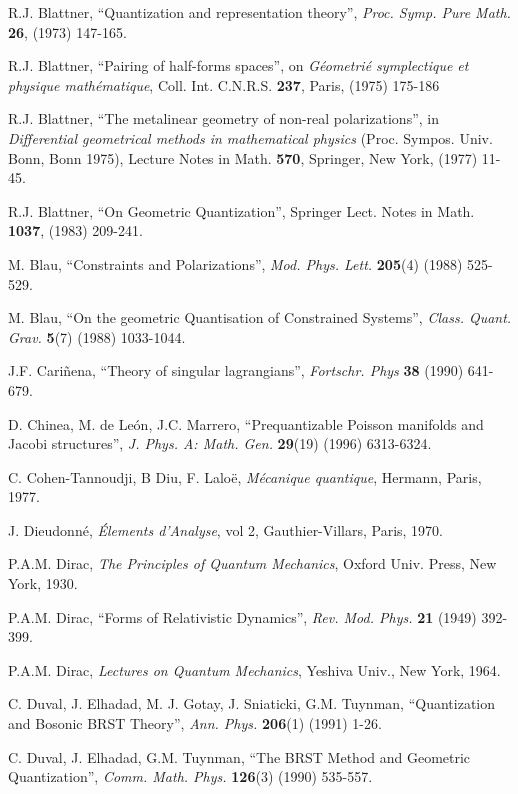 \documentclass[12pt]{article}
\theoremstyle{plain}
\begin{document}
\begin{thebibliography}{55}
{\sc R.J. Blattner},
``Quantization and representation theory'',
{\it Proc. Symp. Pure Math.} {\bf 26}, (1973) 147-165.

{\sc R.J. Blattner},
``Pairing of half-forms spaces'',
on {\it G\'eometri\'e symplectique et physique math\'ematique},
Coll. Int. C.N.R.S. {\bf 237}, Paris, (1975) 175-186

{\sc R.J. Blattner},
``The metalinear geometry of non-real polarizations'',
in {\it Differential geometrical methods in mathematical physics}
(Proc. Sympos. Univ. Bonn, Bonn 1975),
Lecture Notes in Math. {\bf 570},
Springer, New York, (1977) 11-45.

{\sc R.J. Blattner},
``On Geometric Quantization'',
Springer Lect. Notes in Math.
{\bf 1037}, (1983) 209-241.

{\sc M. Blau},
``Constraints and Polarizations'',
{\it Mod. Phys. Lett.} {\bf 205}(4) (1988) 525-529.

{\sc M. Blau},
``On the geometric Quantisation of Constrained Systems'',
{\it Class. Quant. Grav.} {\bf 5}(7) (1988) 1033-1044.

{\sc J.F. Cari\~nena},
``Theory of singular lagrangians'',
{\it Fortschr. Phys} {\bf 38} (1990) 641-679.

{\sc D. Chinea, M. de Le\'on, J.C. Marrero},
``Prequantizable Poisson manifolds and Jacobi structures'',
{\it J. Phys. A: Math. Gen.} {\bf 29}(19) (1996) 6313-6324.

{\sc C. Cohen-Tannoudji, B Diu, F. Lalo\"e},
{\it M\'ecanique quantique},
Hermann, Paris, 1977.

{\sc J. Dieudonn\'e},
{\it \'Elements d'Analyse},
vol 2, Gauthier-Villars, Paris, 1970.

{\sc P.A.M. Dirac},
{\it The Principles of Quantum Mechanics},
Oxford Univ. Press, New York, 1930.

{\sc P.A.M. Dirac},
``Forms of Relativistic Dynamics'',
{\it Rev. Mod. Phys.} {\bf 21} (1949) 392-399.

{\sc P.A.M. Dirac},
{\it Lectures on Quantum Mechanics},
Yeshiva Univ., New York, 1964.

{\sc C. Duval, J. Elhadad, M. J. Gotay, J. Sniaticki, G.M. Tuynman},
``Quantization and Bosonic BRST Theory'',
{\it Ann. Phys.} {\bf 206}(1) (1991) 1-26.

{\sc C. Duval, J. Elhadad, G.M. Tuynman},
``The BRST Method and Geometric Quantization'',
{\it Comm. Math. Phys.} {\bf 126}(3) (1990) 535-557.


\end{thebibliography}
\end{document}
